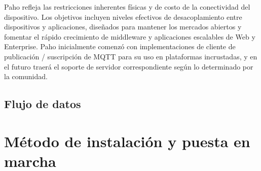 		Paho refleja las restricciones inherentes físicas y de costo de la conectividad del dispositivo. Los objetivos incluyen niveles efectivos de desacoplamiento entre dispositivos y aplicaciones, diseñados para mantener los mercados abiertos y fomentar el rápido crecimiento de middleware y aplicaciones escalables de Web y Enterprise. Paho inicialmente comenzó con implementaciones de cliente de publicación / suscripción de MQTT para su uso en plataformas incrustadas, y en el futuro traerá el soporte de servidor correspondiente según lo determinado por la comunidad.
		
	\subsection{Flujo de datos}

\section{Método de instalación y puesta en marcha}
\label{makereference4.4}